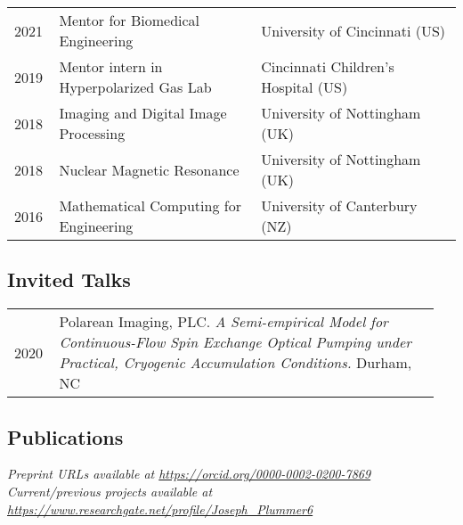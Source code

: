 \documentclass[12pt,]{scrartcl}
\begin{document}
\begin{table}[!h]
{\def\arraystretch{1.5}\tabcolsep=0pt
\begin{tabular}{p{0.10\linewidth}p{0.45\linewidth}p{0.45\linewidth}}

2021 & Mentor for Biomedical Engineering & University of Cincinnati (US)\\

 2019 & Mentor intern in Hyperpolarized Gas Lab & Cincinnati Children's Hospital (US)\\
  
  2018 & Imaging and Digital Image Processing & University of Nottingham (UK) \\
  
  2018 & Nuclear Magnetic Resonance & University of Nottingham (UK) \\

 2016 & Mathematical Computing for Engineering & University of Canterbury (NZ)  \\
  
\end{tabular}%
}
\end{table}

\subsection{Invited Talks}\label{presentations-and-talks}

\begin{table}[!h]
{\def\arraystretch{1.5}\tabcolsep=0pt
\begin{tabular}{p{0.10\linewidth}p{0.85\linewidth}}
  2020 & Polarean Imaging, PLC. \textit{A Semi-empirical Model for Continuous-Flow Spin Exchange Optical Pumping under Practical, Cryogenic Accumulation Conditions.} Durham, NC \\
  
\end{tabular}%
}
\end{table}

\subsection{Publications}\label{publications}

\emph{Preprint URLs available at
\url{https://orcid.org/0000-0002-0200-7869}}\\
\emph{Current/previous projects available at \url{https://www.researchgate.net/profile/Joseph_Plummer6}}
\end{document}
